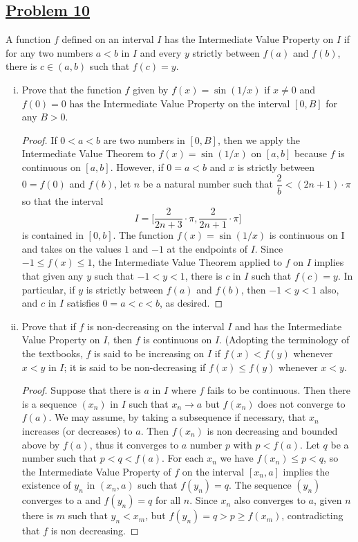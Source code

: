 \documentclass[10pt,letterpaper]{article}
\begin{document}
	\subsection*{{\color{purple}\underline{Problem 10}}}
	A function $f$ defined on an interval $I$ has the Intermediate Value Property on $I$ if
	for any two numbers $a < b$ in $I$ and every $y$ strictly between $f(a)$ and $f(b)$, there is
	$c \in (a, b)$ such that $f(c) = y$.
	\begin{enumerate}[(i)]
		\item Prove that the function $f$ given by $f(x) = \sin(1/x)$ if $x \neq 0$ and $f(0) = 0$ has the
		Intermediate Value Property on the interval $[0, B]$ for any $B > 0$.
\begin{proof}
	If $0 < a < b$ are two numbers in $[0, B]$, then we apply the Intermediate Value Theorem to $f(x) = \sin(1/x)$
	on $[a, b]$ because $f$ is continuous on $[a, b]$. However, if $0 = a < b$ and $x$ is strictly between 
	$0 = f(0)$ and $f(b)$, let $n$ be a natural number such that $\dfrac{2}{b} < (2n+1) \cdot \pi$ so
	that the interval
	$$I = \bigg[\dfrac{2}{2n + 3} \cdot \pi, \dfrac{2}{2n + 1} \cdot \pi\bigg]$$ is contained in $[0, b]$. 
	The function $f(x) = \sin(1/x)$ is continuous on I and takes on the values $1$ and $−1$ at the endpoints of $I$. 
	Since $−1 \leq f(x) \leq 1$, the Intermediate Value Theorem
applied to $f$ on $I$ implies that given any $y$ such that $−1 < y < 1$, there is $c$ in $I$ such that 
$f(c) = y$. In particular, if $y$ is strictly between $f(a)$ and $f(b)$, then $−1 < y < 1$ also, 
and $c$ in $I$ satisfies $0 = a < c < b$, as desired.	
\end{proof}						
		\item Prove that if $f$ is non-decreasing on the interval $I$ and has the Intermediate Value 
		Property on $I$, then $f$ is continuous on $I$. (Adopting the terminology of the textbooks, 
		$f$ is said to be increasing on $I$ if $f(x) < f(y)$ whenever $x < y$ in $I$; it is said
		to be non-decreasing if $f(x) \leq f(y)$ whenever $x < y$.
\begin{proof}
Suppose that there is $a$ in $I$ where $f$ fails to be continuous. Then there is a sequence $(x_n)$ in $I$ 
such that $x_n \rightarrow a$ but $f(x_n)$ does not converge to $f(a)$. We may assume, 
by taking a subsequence if necessary, that $x_n$
increases (or decreases) to $a$. 
	Then $f(x_n)$ is non decreasing and bounded above by $f(a)$, thus it converges to $a$
	number $p$ with $p < f(a)$. 
	Let $q$ be a number such that $p < q < f(a)$. For each $x_n$ we have $f(x_n) \leq p < q$, 
	so the Intermediate Value Property of $f$ on the interval $[x_n, a]$ implies the existence 
	of $y_n$ in $(x_n, a)$ such that $f(y_n) = q$. The sequence $(y_n)$ 
	converges to a and $f(y_n) = q$ for all $n$. 
	Since $x_n$ also converges to $a$, given $n$ there is $m$ such
	that $y_n < x_m$, but $f(y_n) = q > p \geq f(x_m)$, contradicting that $f$ is non decreasing.

\end{proof}		
		
		
	\end{enumerate}
	
\end{document}
